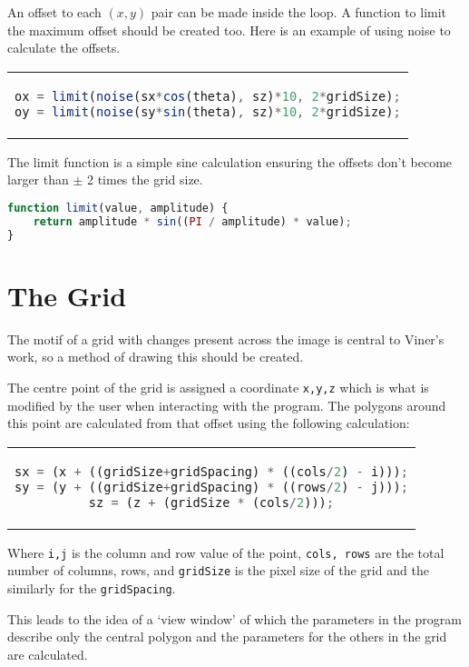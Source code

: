 An offset to each $(x,y)$ pair can be made inside the loop. A function to limit
the maximum offset should be created too. Here is an example of using noise to
calculate the offsets.

\begin{center}
\begin{tabular}{c}
\begin{lstlisting}[language=JavaScript]
ox = limit(noise(sx*cos(theta), sz)*10, 2*gridSize);
oy = limit(noise(sy*sin(theta), sz)*10, 2*gridSize);
\end{lstlisting}
\end{tabular}
\end{center}

The limit function is a simple sine calculation ensuring the offsets don't become
larger than $\pm$ 2 times the grid size.

\begin{lstlisting}[language=JavaScript]
function limit(value, amplitude) {
    return amplitude * sin((PI / amplitude) * value);
}
\end{lstlisting}

\section{The Grid}
The motif of a grid with changes present across the image is central to Viner's
work, so a method of drawing this should be created.

The centre point of the grid is assigned a coordinate \verb|x,y,z| which is what
is modified by the user when interacting with the program. The polygons around
this point are calculated from that offset using the following calculation:

\begin{center}
\begin{tabular}{c}
\begin{lstlisting}[language=JavaScript]
sx = (x + ((gridSize+gridSpacing) * ((cols/2) - i)));
sy = (y + ((gridSize+gridSpacing) * ((rows/2) - j)));
sz = (z + (gridSize * (cols/2)));
\end{lstlisting}
\end{tabular}
\end{center}

Where \verb|i,j| is the column and row value of the point, \verb|cols, rows|
are the total number of columns, rows, and \verb|gridSize| is the pixel size
of the grid and the similarly for the \verb|gridSpacing|. 

This leads to the idea of a `view window' of which the parameters in the program
describe only the central polygon and the parameters for the others in the grid
are calculated.

